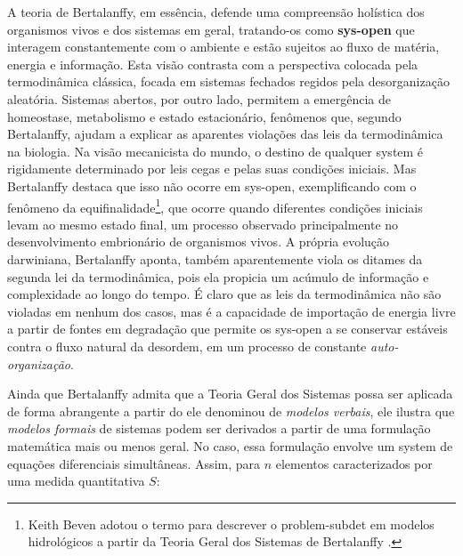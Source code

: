 \documentclass[./main.tex]{subfiles}
\begin{document}
\par A \gls{teoria} de Bertalanffy, em essência, defende uma compreensão holística dos organismos vivos e dos sistemas em geral, tratando-os como \textbf{\gls{sys-open}} que interagem constantemente com o ambiente e estão sujeitos ao fluxo de matéria, energia e informação. Esta visão contrasta com a perspectiva colocada pela termodinâmica clássica, focada em sistemas fechados regidos pela desorganização aleatória. Sistemas abertos, por outro lado, permitem a emergência de homeostase, metabolismo e estado estacionário, fenômenos que, segundo Bertalanffy, ajudam a explicar as aparentes violações das leis da termodinâmica na biologia. Na visão mecanicista do mundo, o destino de qualquer \gls{system} é rigidamente determinado por leis cegas e pelas suas condições iniciais. Mas Bertalanffy destaca que isso não ocorre em \gls{sys-open}, exemplificando com o fenômeno da equifinalidade\footnote{Keith Beven adotou o termo  para descrever o \gls{problem-subdet} em modelos hidrológicos a partir da Teoria Geral dos Sistemas de Bertalanffy \cite{Beven2012}.}, que ocorre quando diferentes condições iniciais levam ao mesmo estado final, um processo observado principalmente no desenvolvimento embrionário de organismos vivos. A própria evolução darwiniana, Bertalanffy aponta, também aparentemente viola os ditames da segunda lei da termodinâmica, pois ela propicia um acúmulo de informação e complexidade ao longo do tempo. É claro que as leis da termodinâmica não são violadas em nenhum dos casos, mas é a capacidade de importação de energia livre a partir de fontes em degradação que permite os \gls{sys-open} a se conservar estáveis contra o fluxo natural da desordem, em um processo de constante \textit{auto-organização}.

\par Ainda que Bertalanffy admita que a Teoria Geral dos Sistemas possa ser aplicada de forma abrangente a partir do ele denominou de \textit{modelos verbais}, ele ilustra que \textit{modelos formais} de sistemas podem ser derivados a partir de uma formulação matemática mais ou menos geral. No caso, essa formulação envolve um \gls{system} de equações diferenciais simultâneas. Assim, para $n$ elementos caracterizados por uma medida quantitativa $S$:
\end{document}
